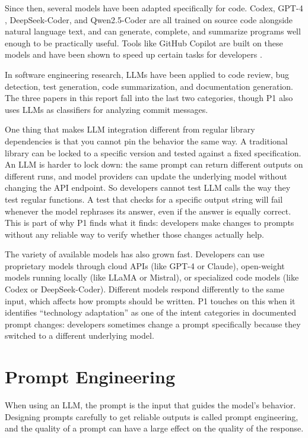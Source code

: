 \documentclass[
    pdftex,
    final,
    11pt,
    a4paper,
    parskip=false,
    oneside,
    footheight=0mm,
    footinclude=false,
    toc=bibliography
]{scrbook}
\begin{document}
Since then, several models have been adapted specifically for code. Codex, GPT-4 \cite{OpenAI2023}, DeepSeek-Coder, and Qwen2.5-Coder are all trained on source code alongside natural language text, and can generate, complete, and summarize programs well enough to be practically useful. Tools like GitHub Copilot are built on these models and have been shown to speed up certain tasks for developers \cite{Ziegler2022}.

In software engineering research, LLMs have been applied to code review, bug detection, test generation, code summarization, and documentation generation. The three papers in this report fall into the last two categories, though P1 also uses LLMs as classifiers for analyzing commit messages.

One thing that makes LLM integration different from regular library dependencies is that you cannot pin the behavior the same way. A traditional library can be locked to a specific version and tested against a fixed specification. An LLM is harder to lock down: the same prompt can return different outputs on different runs, and model providers can update the underlying model without changing the API endpoint. So developers cannot test LLM calls the way they test regular functions. A test that checks for a specific output string will fail whenever the model rephrases its answer, even if the answer is equally correct. This is part of why P1 finds what it finds: developers make changes to prompts without any reliable way to verify whether those changes actually help.

The variety of available models has also grown fast. Developers can use proprietary models through cloud APIs (like GPT-4 or Claude), open-weight models running locally (like LLaMA or Mistral), or specialized code models (like Codex or DeepSeek-Coder). Different models respond differently to the same input, which affects how prompts should be written. P1 touches on this when it identifies ``technology adaptation'' as one of the intent categories in documented prompt changes: developers sometimes change a prompt specifically because they switched to a different underlying model.

\section{Prompt Engineering}

When using an LLM, the prompt is the input that guides the model's behavior. Designing prompts carefully to get reliable outputs is called prompt engineering, and the quality of a prompt can have a large effect on the quality of the response.
\end{document}
